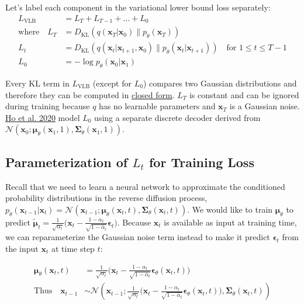 \documentclass[12pt]{article}
\begin{document}
Let's label each component in the variational lower bound loss separately:
\[
\begin{aligned}
L_\text{VLB} &= L_T + L_{T-1} + \dots + L_0 \\
\text{where} \quad L_T &= D_\text{KL}(q(\mathbf{x}_T \vert \mathbf{x}_0) \parallel p_\theta(\mathbf{x}_T)) \\
L_t &= D_\text{KL}(q(\mathbf{x}_t \vert \mathbf{x}_{t+1}, \mathbf{x}_0) \parallel p_\theta(\mathbf{x}_t \vert\mathbf{x}_{t+1})) \quad \text{for } 1 \leq t \leq T-1 \\
L_0 &= - \log p_\theta(\mathbf{x}_0 \vert \mathbf{x}_1)
\end{aligned}
\]

Every KL term in $L_\text{VLB}$ (except for $L_0$) compares two Gaussian distributions and therefore they can be computed in \href{https://en.wikipedia.org/wiki/Kullback%E2%80%93Leibler_divergence#Multivariate_normal_distributions}{closed form}. $L_T$ is constant and can be ignored during training because $q$ has no learnable parameters and $\mathbf{x}_T$ is a Gaussian noise. \href{https://arxiv.org/abs/2006.11239}{Ho et al. 2020} model $L_0$ using a separate discrete decoder derived from $\mathcal{N}(\mathbf{x}_0; \boldsymbol{\mu}_\theta(\mathbf{x}_1, 1), \boldsymbol{\Sigma}_\theta(\mathbf{x}_1, 1))$.

\subsection{Parameterization of $L_t$ for Training Loss}
Recall that we need to learn a neural network to approximate the conditioned probability distributions in the reverse diffusion process, $p_\theta(\mathbf{x}_{t-1} \vert \mathbf{x}_t) = \mathcal{N}(\mathbf{x}_{t-1}; \boldsymbol{\mu}_\theta(\mathbf{x}_t, t), \boldsymbol{\Sigma}_\theta(\mathbf{x}_t, t))$. We would like to train $\boldsymbol{\mu}_\theta$ to predict $\tilde{\boldsymbol{\mu}}_t = \frac{1}{\sqrt{\alpha_t}} \Big( \mathbf{x}_t - \frac{1 - \alpha_t}{\sqrt{1 - \bar{\alpha}_t}} \boldsymbol{\epsilon}_t \Big)$. Because $\mathbf{x}_t$ is available as input at training time, we can reparameterize the Gaussian noise term instead to make it predict $\boldsymbol{\epsilon}_t$ from the input $\mathbf{x}_t$ at time step $t$:

\[
\begin{aligned}
\boldsymbol{\mu}_\theta(\mathbf{x}_t, t) &= \frac{1}{\sqrt{\alpha_t}} \Big( \mathbf{x}_t - \frac{1 - \alpha_t}{\sqrt{1 - \bar{\alpha}_t}} \boldsymbol{\epsilon}_\theta(\mathbf{x}_t, t) \Big) \\
\text{Thus} \quad \mathbf{x}_{t-1} &\sim \mathcal{N}\left(\mathbf{x}_{t-1}; \frac{1}{\sqrt{\alpha_t}} \Big( \mathbf{x}_t - \frac{1 - \alpha_t}{\sqrt{1 - \bar{\alpha}_t}} \boldsymbol{\epsilon}_\theta(\mathbf{x}_t, t) \Big), \boldsymbol{\Sigma}_\theta(\mathbf{x}_t, t)\right)
\end{aligned}
\]
\end{document}
